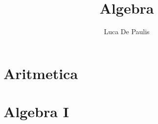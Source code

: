 \documentclass[italian,oneside,headinclude,10pt]{scrbook}
\begin{document}
\author{Luca De Paulis}
\title{Algebra}
\maketitle

\tableofcontents
\part{Aritmetica}
% 
% 
% 
% 
% 

% 















\part{Algebra I}





\end{document}
